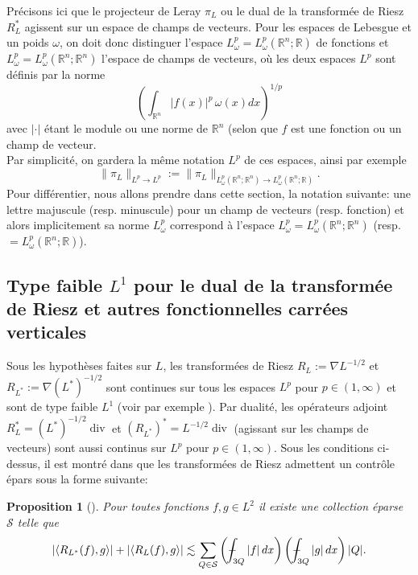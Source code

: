 \documentclass[11pt]{amsart}
\newtheorem{proposition}[theorem]{Proposition}
\DeclareMathOperator{\dive}{div}
\newcommand{\rr}{\mathbb}
\newcommand{\mcS}{{\mathcal S}}
\def\Xint#1{\mathchoice
   {\XXint\displaystyle\textstyle{#1}}%
   {\XXint\textstyle\scriptstyle{#1}}%
   {\XXint\scriptstyle\scriptscriptstyle{#1}}%
   {\XXint\scriptscriptstyle\scriptscriptstyle{#1}}%
   \!\int}
\def\XXint#1#2#3{{\setbox0=\hbox{$#1{#2#3}{\int}$}
     \vcenter{\hbox{$#2#3$}}\kern-.5\wd0}}
\def\aver#1{\Xint-_{#1}}
\begin{document}
\medskip

Pr\'ecisons ici que le projecteur de Leray $\pi_L$  ou le dual de la transform\'ee de Riesz $R_L^*$ agissent sur un espace de champs de vecteurs. Pour les espaces de Lebesgue et un poids $\omega$, on doit donc distinguer l'espace $L^p_\omega= L^p_\omega({\rr R}^n; {\rr R})$ de fonctions et $L^p_\omega=L^p_\omega({\rr R}^n;{\rr R}^n)$ l'espace de champs de vecteurs, o\`u les deux espaces $L^p$ sont d\'efinis par la norme
$$ \left(\int_{{\rr R}^n} |f(x)|^p \, \omega(x) dx \right)^{1/p}$$
avec $|\cdot|$ \'etant le module ou une norme de ${\rr R}^n$ (selon que $f$ est une fonction ou un champ de vecteur. \\
Par simplicit\'e, on gardera la m\^eme notation $L^p$ de ces espaces, ainsi par exemple
$$ \| \pi_L\|_{L^p \to L^p} := \| \pi_L\|_{L^p_\omega({\rr R}^n;{\rr R}^n) \to L^p_\omega({\rr R}^n; {\rr R})}. $$
Pour diff\'erentier, nous allons prendre dans cette section, la notation suivante: une lettre majuscule (resp. minuscule) pour un champ de vecteurs (resp. fonction) et alors implicitement sa norme $L^p_\omega$ correspond \`a l'espace $L^p_\omega=L^p_\omega({\rr R}^n;{\rr R}^n)$ (resp. $=L^p_\omega({\rr R}^n;{\rr R})$).




\subsection{Type faible $L^1$ pour le dual de la transform\'ee de Riesz et autres fonctionnelles carr\'ees verticales}

Sous les hypoth\`eses faites sur $L$, les transform\'ees de Riesz $R_L:=\nabla L^{-1/2}$ et $R_{L^*}:=\nabla (L^*)^{-1/2}$ sont continues sur tous les espaces $L^p$ pour $p\in(1,\infty)$ et sont de type faible $L^1$ (voir par exemple \cite{Auscher-memoire}). Par dualit\'e, les op\'erateurs adjoint $R_L^* = (L^*)^{-1/2} \dive$ et $(R_{L^*})^* = L^{-1/2} \dive$ (agissant sur les champs de vecteurs) sont aussi continus sur $L^p$ pour $p\in(1,\infty)$.
Sous les conditions ci-dessus, il est montr\'e dans \cite{BernicotFreyPetermichl} que les transform\'ees de Riesz admettent un contr\^ole \'epars sous la forme suivante:

\begin{proposition}[\cite{BernicotFreyPetermichl}] Pour toutes fonctions $f,g\in L^2$ il existe une collection \'eparse $\mcS$ telle que
$$ \left| \langle R_{L^*}(f), g\rangle \right| + \left| \langle R_L(f), g\rangle \right| \lesssim \sum_{Q\in \mcS} \left(\aver{3Q} |f|\, dx \right) \left(\aver{3Q} |g|\, dx \right) |Q|. $$
\end{proposition}
\end{document}
